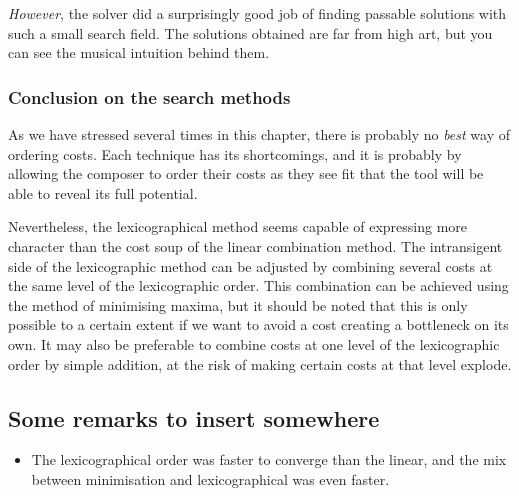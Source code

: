 \textit{However}, the solver did a surprisingly good job of finding passable solutions with such a small search field. The solutions obtained are far from high art, but you can see the musical intuition behind them.

\subsubsection{Conclusion on the search methods}
As we have stressed several times in this chapter, there is probably no \textit{best} way of ordering costs. Each technique has its shortcomings, and it is probably by allowing the composer to order their costs as they see fit that the tool will be able to reveal its full potential. 

Nevertheless, the lexicographical method seems capable of expressing more character than the cost soup of the linear combination method. The intransigent side of the lexicographic method can be adjusted by combining several costs at the same level of the lexicographic order. This combination can be achieved using the method of minimising maxima, but it should be noted that this is only possible to a certain extent if we want to avoid a cost creating a bottleneck on its own.  It may also be preferable to combine costs at one level of the lexicographic order by simple addition, at the risk of making certain costs at that level explode.


\subsection{Some remarks to insert somewhere}
\begin{itemize}
    \item The lexicographical order was faster to converge than the linear, and the mix between minimisation and lexicographical was even faster.
\end{itemize}